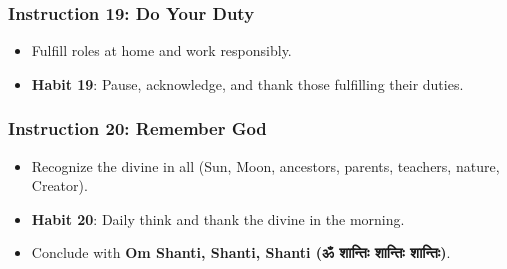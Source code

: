 \begin{frame}[fragile]\frametitle{Instruction 19: Do Your Duty}
      \begin{itemize}
          \item Fulfill roles at home and work responsibly.
          \item \textbf{Habit 19}: Pause, acknowledge, and thank those fulfilling their duties.
      \end{itemize}
\end{frame}

\begin{frame}[fragile]\frametitle{Instruction 20: Remember God}
      \begin{itemize}
          \item Recognize the divine in all (Sun, Moon, ancestors, parents, teachers, nature, Creator).
          \item \textbf{Habit 20}: Daily think and thank the divine in the morning.
          \item Conclude with \textbf{Om Shanti, Shanti, Shanti (ॐ शान्तिः शान्तिः शान्तिः)}.
      \end{itemize}
\end{frame}



